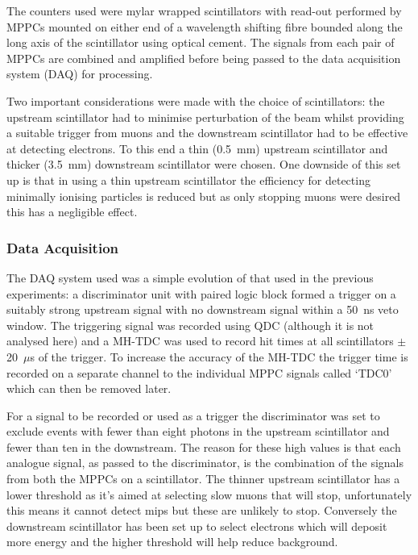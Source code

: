 The counters used were mylar wrapped scintillators with read-out performed by MPPCs mounted on either end of a wavelength shifting fibre bounded along the long axis of the scintillator using optical cement. The signals from each pair of MPPCs are combined and amplified before being passed to the data acquisition system (DAQ) for processing.

Two important considerations were made with the choice of scintillators: the upstream scintillator had to minimise perturbation of the beam whilst providing a suitable trigger from muons and the downstream scintillator had to be effective at detecting electrons. To this end a thin (0.5~mm) upstream scintillator and thicker (3.5~mm) downstream scintillator were chosen. One downside of this set up is that in using a thin upstream scintillator the efficiency for detecting minimally ionising particles is reduced but as only stopping muons were desired this has a negligible effect.

\subsubsection{Data Acquisition} %
\label{sub:data_acquisition}
The DAQ system used was a simple evolution of that used in the previous experiments: a discriminator unit with paired logic block formed a trigger on a suitably strong upstream signal with no downstream signal within a 50~ns veto window. The triggering signal was recorded using QDC (although it is not analysed here) and a MH-TDC was used to record hit times at all scintillators \(\pm\)20~\(\mu\)s of the trigger. To increase the accuracy of the MH-TDC the trigger time is recorded on a separate channel to the individual MPPC signals called `TDC0' which can then be removed later.

For a signal to be recorded or used as a trigger the discriminator was set to exclude events with fewer than eight photons in the upstream scintillator and fewer than ten in the downstream. The reason for these high values is that each analogue signal, as passed to the discriminator, is the combination of the signals from both the MPPCs on a scintillator. The thinner upstream scintillator has a lower threshold as it's aimed at selecting slow muons that will stop, unfortunately this means it cannot detect mips but these are unlikely to stop. Conversely the downstream scintillator has been set up to select electrons which will deposit more energy and the higher threshold will help reduce background.

